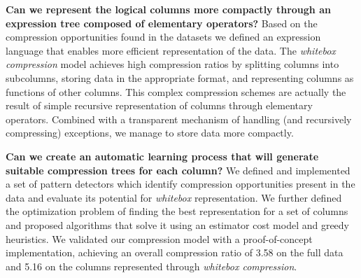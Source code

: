 \textbf{Can we represent the logical columns more compactly through an expression tree composed of elementary operators?} Based on the compression opportunities found in the datasets we defined an expression language that enables more efficient representation of the data. The \textit{whitebox compression} model achieves high compression ratios by splitting columns into subcolumns, storing data in the appropriate format, and representing columns as functions of other columns. This complex compression schemes are actually the result of simple recursive representation of columns through elementary operators. Combined with a transparent mechanism of handling (and recursively compressing) exceptions, we manage to store data more compactly.
\iffalse
\fi

\textbf{Can we create an automatic learning process that will generate suitable compression trees for each column?}
We defined and implemented a set of pattern detectors which identify compression opportunities present in the data and evaluate its potential for \textit{whitebox} representation. We further defined the optimization problem of finding the best representation for a set of columns and proposed algorithms that solve it using an estimator cost model and greedy heuristics. We validated our compression model with a proof-of-concept implementation, achieving an overall compression ratio of 3.58 on the full data and 5.16 on the columns represented through \textit{whitebox compression}.\\
\iffalse
\fi

